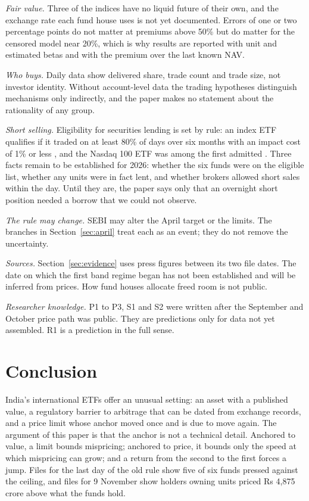 \emph{Fair value.} Three of the indices have no liquid future of their own, and the exchange rate each fund house uses is not yet documented. Errors of one or two percentage points do not matter at premiums above 50\% but do matter for the censored model near 20\%, which is why results are reported with unit and estimated betas and with the premium over the last known NAV.

\emph{Who buys.} Daily data show delivered share, trade count and trade size, not investor identity. Without account-level data the trading hypotheses distinguish mechanisms only indirectly, and the paper makes no statement about the rationality of any group.

\emph{Short selling.} Eligibility for securities lending is set by rule: an index ETF qualifies if it traded on at least 80\% of days over six months with an impact cost of 1\% or less \citep{bs2012slb}, and the Nasdaq 100 ETF was among the first admitted \citep{bs2013slb}. Three facts remain to be established for 2026: whether the six funds were on the eligible list, whether any units were in fact lent, and whether brokers allowed short sales within the day. Until they are, the paper says only that an overnight short position needed a borrow that we could not observe.

\emph{The rule may change.} SEBI may alter the April target or the limits. The branches in Section~\ref{sec:april} treat each as an event; they do not remove the uncertainty.

\emph{Sources.} Section~\ref{sec:evidence} uses press figures between its two file dates. The date on which the first band regime began has not been established and will be inferred from prices. How fund houses allocate freed room is not public.

\emph{Researcher knowledge.} P1 to P3, S1 and S2 were written after the September and October price path was public. They are predictions only for data not yet assembled. R1 is a prediction in the full sense.

\section{Conclusion}\label{sec:conclusion}
India's international ETFs offer an unusual setting: an asset with a published value, a regulatory barrier to arbitrage that can be dated from exchange records, and a price limit whose anchor moved once and is due to move again. The argument of this paper is that the anchor is not a technical detail. Anchored to value, a limit bounds mispricing; anchored to price, it bounds only the speed at which mispricing can grow; and a return from the second to the first forces a jump. Files for the last day of the old rule show five of six funds pressed against the ceiling, and files for 9 November show holders owning units priced Rs 4,875 crore above what the funds hold.

